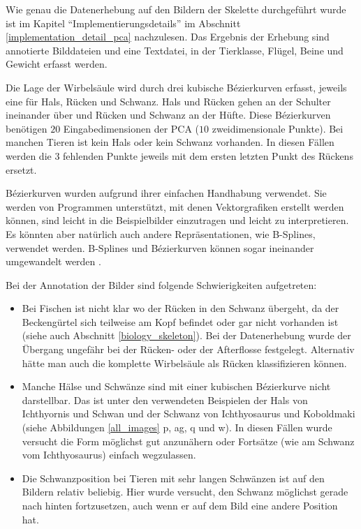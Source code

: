  Wie genau die Datenerhebung auf den Bildern der Skelette durchgeführt wurde ist im Kapitel "`Implementierungsdetails"' im Abschnitt \ref{implementation_detail_pca} nachzulesen.
 Das Ergebnis der Erhebung sind annotierte Bilddateien und eine Textdatei, in der Tierklasse, Flügel, Beine und Gewicht erfasst werden.
 
 Die Lage der Wirbelsäule wird durch drei kubische Bézierkurven erfasst, jeweils eine für Hals, Rücken und Schwanz. Hals und Rücken gehen an der Schulter ineinander über und Rücken und Schwanz an der Hüfte.
 Diese Bézierkurven benötigen $20$ Eingabedimensionen der PCA ($10$ zweidimensionale Punkte). Bei manchen Tieren ist kein Hals oder kein Schwanz vorhanden. In diesen Fällen werden die $3$ fehlenden Punkte jeweils mit dem ersten \bzw letzten Punkt des Rückens ersetzt.
 
 Bézierkurven wurden aufgrund ihrer einfachen Handhabung verwendet. Sie werden von Programmen unterstützt, mit denen Vektorgrafiken erstellt werden können, sind leicht in die Beispielbilder einzutragen und leicht zu interpretieren. Es könnten aber natürlich auch andere Repräsentationen, wie B-Splines, verwendet werden. B-Splines und Bézierkurven können sogar ineinander umgewandelt werden \cite{BezierAndBSplineTechniques}.
 
 \newpage
 Bei der Annotation der Bilder sind folgende Schwierigkeiten aufgetreten:
 \begin{itemize}
  \item Bei Fischen ist nicht klar wo der Rücken in den Schwanz übergeht, da der Beckengürtel sich teilweise am Kopf befindet oder gar nicht vorhanden ist (siehe auch Abschnitt \ref{biology_skeleton}). Bei der Datenerhebung wurde der Übergang ungefähr bei der Rücken- oder der Afterflosse festgelegt. Alternativ hätte man auch die komplette Wirbelsäule als Rücken klassifizieren können.
  
  \item Manche Hälse und Schwänze sind mit einer kubischen Bézierkurve nicht darstellbar. Das ist unter den verwendeten Beispielen der Hals von Ichthyornis und Schwan und der Schwanz von Ichthyosaurus und Koboldmaki (siehe Abbildungen \ref{all_images} p, ag, q und w). In diesen Fällen wurde versucht die Form möglichst gut anzunähern oder Fortsätze (wie am Schwanz vom Ichthyosaurus) einfach wegzulassen.
  
  \item Die Schwanzposition bei Tieren mit sehr langen Schwänzen ist auf den Bildern relativ beliebig. Hier wurde versucht, den Schwanz möglichst gerade nach hinten fortzusetzen, auch wenn er auf dem Bild eine andere Position hat.
 \end{itemize}
 
